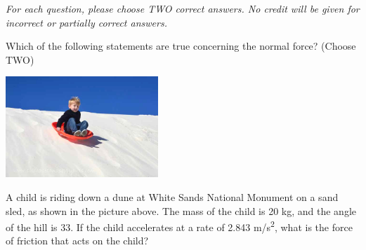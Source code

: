 \documentclass[10pt]{examdesign}
\begin{document}
\begin{multiplechoice} [title={Multiple Correct Multiple Choice}]
\textit{	For each question, please choose TWO correct answers.  No credit will be given for incorrect or partially correct answers. }

	\begin{question}
	Which of the following statements are true concerning the normal force? (Choose TWO)
\end{question}


\end{multiplechoice}

\begin{shortanswer}  [title={Free Response}, rearrange=no]
	
\begin{center}
\includegraphics[height=1.5in]{DSC_3566.jpg}
\end{center}


	\begin{question}
	A child is riding down a dune at White Sands National Monument on a sand sled, as shown in the picture above.  The mass of the child is 20 kg, and the angle of the hill is 33\degree.   If the child accelerates at a rate of 2.843 m/s\textsuperscript{2}, what is the force of friction that acts on the child? 
	\end{question}
	
	\end{shortanswer}
\end{document}
